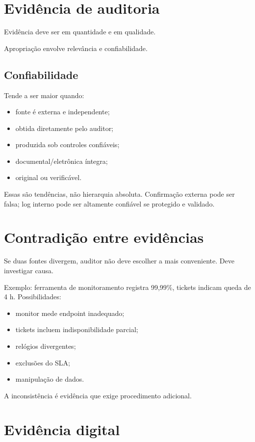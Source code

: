 \section{Evidência de auditoria}

Evidência deve ser  em quantidade e  em qualidade.

Apropriação envolve relevância e confiabilidade.

\subsection{Confiabilidade}

Tende a ser maior quando:
\begin{itemize}
\item fonte é externa e independente;
\item obtida diretamente pelo auditor;
\item produzida sob controles confiáveis;
\item documental/eletrônica íntegra;
\item original ou verificável.
\end{itemize}

Essas são tendências, não hierarquia absoluta. Confirmação externa pode ser falsa; log interno pode ser altamente confiável se protegido e validado.

\section{Contradição entre evidências}

Se duas fontes divergem, auditor não deve escolher a mais conveniente. Deve investigar causa.

Exemplo: ferramenta de monitoramento registra 99,99\%, tickets indicam queda de 4 h. Possibilidades:
\begin{itemize}
\item monitor mede endpoint inadequado;
\item tickets incluem indisponibilidade parcial;
\item relógios divergentes;
\item exclusões do SLA;
\item manipulação de dados.
\end{itemize}

A inconsistência é evidência que exige procedimento adicional.

\section{Evidência digital}

